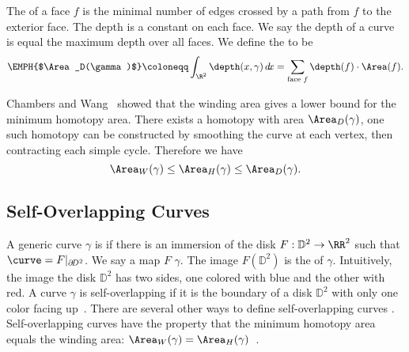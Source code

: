 

The  of a face $f$ is the minimal number of edges crossed 
 by a path from $f$ to the exterior face.
 The depth is a constant on each face.
 We say the depth of a curve is equal the maximum depth over all faces.
 We define the  to be
\[
 \EMPH{$\Area_D(\gamma)$} \coloneqq \int_{\R^2} \depth(x,\gamma)\, d\!x
 = \sum_{\text{face $f$}} \depth(f) \cdot \Area(f).
 \]

 Chambers and Wang~\cite{cw2013} showed that the winding area gives a lower 
 bound for the minimum homotopy area.
There exists a homotopy with area $\Area_D(\gamma)$, 
one such homotopy can be constructed by smoothing the curve
at each vertex, then contracting each simple cycle.
 Therefore we have
 \[
     \Area_W(\gamma) \leq \Area_H(\gamma) \leq \Area_D(\gamma).
 \]


 \subsection{Self-Overlapping Curves}

 A generic curve $\gamma$ is  if there is an immersion of the disk
 $F:\mathbb{D}^2\rightarrow \RR^2$ such that $\curve= F|_{\partial\!D^2}$.
 We say a map $F$  $\gamma$.
The image $F(\mathbb{D}^2)$ is the  of $\gamma$.
 Intuitively, the image the disk $\mathbb{D}^2$ has two sides, one colored with 
 blue and the other with red.
 A curve $\gamma$ is self-overlapping if it is the boundary of a disk $\mathbb{D}^2$ 
 with only one color facing up~\cite{mukherjee2014}.
 There are several other ways to define self-overlapping curves
  \cite{evansFasyWenk,titus,shor-van-wyk,so-graphics}.
  Self-overlapping curves have the property that the minimum 
  homotopy area equals the winding area:
 $\Area_W(\gamma) = \Area_H(\gamma)$~\cite{fkw2017}.


